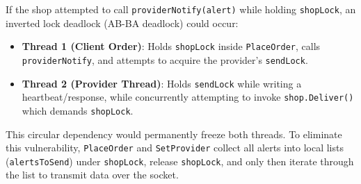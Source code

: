 \documentclass[11pt,a4paper]{article}
\begin{document}
\begin{enumerate}
    If the shop attempted to call \texttt{providerNotify(alert)} while holding \texttt{shopLock}, an inverted lock deadlock (AB-BA deadlock) could occur:
    \begin{itemize}
        \item \textbf{Thread 1 (Client Order)}: Holds \texttt{shopLock} inside \texttt{PlaceOrder}, calls \texttt{providerNotify}, and attempts to acquire the provider's \texttt{sendLock}.
        \item \textbf{Thread 2 (Provider Thread)}: Holds \texttt{sendLock} while writing a heartbeat/response, while concurrently attempting to invoke \texttt{shop.Deliver()} which demands \texttt{shopLock}.
    \end{itemize}
    This circular dependency would permanently freeze both threads. To eliminate this vulnerability, \texttt{PlaceOrder} and \texttt{SetProvider} collect all alerts into local lists (\texttt{alertsToSend}) under \texttt{shopLock}, release \texttt{shopLock}, and only then iterate through the list to transmit data over the socket.
\end{enumerate}
\end{document}

